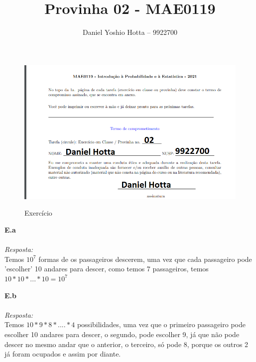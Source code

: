 \documentclass{article}
\begin{document}
	
	\title{Provinha 02 - MAE0119}
	\author{Daniel Yoshio Hotta – 9922700}
	
	\begin{figure}[h]
		\caption{Exercício}
		\centering %
		\includegraphics[width=14cm]{termo.png} %
		\label{figura: Termo}
	\end{figure}
	
	\maketitle	
	
	\textbf {E.a} 
	\\ \\
	\textit {Resposta:} \\
    
    Temos $10^7$ formas de os passageiros descerem, uma vez que cada passageiro pode 'escolher' 10 andares para descer, como temos 7 passageiros, temos $10 * 10 * ... * 10 = 10^7$\\
    
    \maketitle	
    
    \textbf {E.b} 
    \\ \\
    \textit {Resposta:} \\
	
    Temos $10 * 9 * 8 * .... * 4$ possibilidades, uma vez que o primeiro passageiro pode escolher 10 andares para descer, o segundo, pode escolher 9, já que não pode descer no mesmo andar que o anterior, o terceiro, só pode 8, porque os outros 2 já foram ocupados e assim por diante.\\
	
\end{document}
